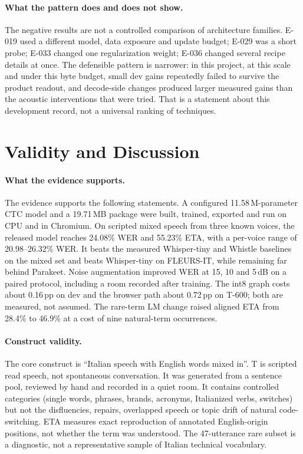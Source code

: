 \documentclass{article}
\begin{document}
\paragraph{What the pattern does and does not show.}
The negative results are not a controlled comparison of architecture families. E-019 used a
different model, data exposure and update budget; E-029 was a short probe; E-033 changed one
regularization weight; E-036 changed several recipe details at once. The defensible pattern is
narrower: in this project, at this scale and under this byte budget, small dev gains repeatedly
failed to survive the product readout, and decode-side changes produced larger measured gains than
the acoustic interventions that were tried. That is a statement about this development record, not
a universal ranking of techniques.

\section{Validity and Discussion}
\label{sec:validity}

\paragraph{What the evidence supports.}
The evidence supports the following statements. A configured 11.58\,M-parameter CTC model and a
19.71\,MB package were built, trained, exported and run on CPU and in Chromium. On scripted mixed
speech from three known voices, the released model reaches 24.08\% WER and 55.23\% ETA, with a
per-voice range of 20.98--26.32\% WER. It beats the measured Whisper-tiny and Whistle baselines on
the mixed set and beats Whisper-tiny on FLEURS-IT, while remaining far behind Parakeet. Noise
augmentation improved WER at 15, 10 and 5\,dB on a paired protocol, including a room recorded
after training. The int8 graph costs about 0.16\,pp on dev and the browser path about 0.72\,pp on
T-600; both are measured, not assumed. The rare-term LM change raised aligned ETA from 28.4\% to
46.9\% at a cost of nine natural-term occurrences.

\paragraph{Construct validity.}
The core construct is ``Italian speech with English words mixed in''. T is scripted read speech,
not spontaneous conversation. It was generated from a sentence pool, reviewed by hand and recorded
in a quiet room. It contains controlled categories (single words, phrases, brands, acronyms,
Italianized verbs, switches) but not the disfluencies, repairs, overlapped speech or topic drift
of natural code-switching. ETA measures exact reproduction of annotated English-origin positions,
not whether the term was understood. The 47-utterance rare subset is a diagnostic, not a
representative sample of Italian technical vocabulary.
\end{document}
